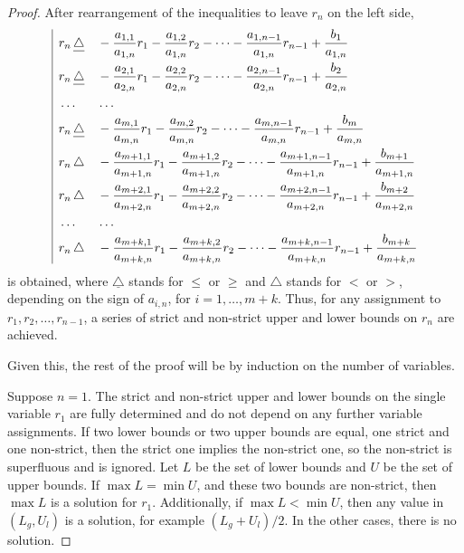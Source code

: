 \documentclass{article}
\begin{document}
\begin{proof}
  After rearrangement of the inequalities to leave $r_n$ on the left side,
  \[
  \begin{array}{|l@{}}
    \begin{aligned}
      &r_n \,\underline\triangle&& - \frac{a_{1, 1}}{a_{1,n}}r_1 - \frac{a_{1, 2}}{a_{1, n}}r_2 - \dots - \frac{a_{1, n - 1}}{a_{1, n}}r_{n - 1} + \frac{b_1}{a_{1, n}} \\
      &r_n \,\underline\triangle&& - \frac{a_{2, 1}}{a_{2,n}}r_1 - \frac{a_{2, 2}}{a_{2, n}}r_2 - \dots - \frac{a_{2, n - 1}}{a_{2, n}}r_{n - 1} + \frac{b_2}{a_{2, n}} \\
      &\dots&&\dots \\
      &r_n \,\underline\triangle&& - \frac{a_{m, 1}}{a_{m,n}}r_1 - \frac{a_{m, 2}}{a_{m, n}}r_2 - \dots - \frac{a_{m, n - 1}}{a_{m, n}}r_{n - 1} + \frac{b_m}{a_{m, n}} \\
      &r_n \,\triangle&& - \frac{a_{m+1, 1}}{a_{m+1,n}}r_1 - \frac{a_{m+1, 2}}{a_{m+1, n}}r_2 - \dots - \frac{a_{m+1, n - 1}}{a_{m+1, n}}r_{n - 1} + \frac{b_{m+1}}{a_{m+1, n}} \\
      &r_n \,\triangle&& - \frac{a_{m+2, 1}}{a_{m+2,n}}r_1 - \frac{a_{m+2, 2}}{a_{m+2, n}}r_2 - \dots - \frac{a_{m+2, n - 1}}{a_{m+2, n}}r_{n - 1} + \frac{b_{m+2}}{a_{m+2, n}} \\
      &\dots&&\dots \\
      &r_n \,\triangle&& - \frac{a_{m+k, 1}}{a_{m+k,n}}r_1 - \frac{a_{m+k, 2}}{a_{m+k, n}}r_2 - \dots - \frac{a_{m+k, n - 1}}{a_{m+k, n}}r_{n - 1} + \frac{b_{m+k}}{a_{m+k, n}} \\
    \end{aligned}
  \end{array}
  \]
  is obtained, where $\underline\triangle$ stands for $\leq$ or $\geq$ and $\triangle$ stands for $<$ or $>$, depending on the sign of $a_{i, n}$, for $i = 1, \dots, m+k$. Thus, for any assignment to $r_1, r_2, \dots, r_{n-1}$, a series of strict and non-strict upper and lower bounds on $r_n$ are achieved.

  Given this, the rest of the proof will be by induction on the number of variables.

  Suppose $n = 1$. The strict and non-strict upper and lower bounds on the single variable $r_1$ are fully determined and do not depend on any further variable assignments. If two lower bounds or two upper bounds are equal, one strict and one non-strict, then the strict one implies the non-strict one, so the non-strict is superfluous and is ignored. Let $L$ be the set of lower bounds and $U$ be the set of upper bounds. If $\max L = \min U$, and these two bounds are non-strict, then $\max L$ is a solution for $r_1$. Additionally, if $\max L < \min U$, then any value in $(L_g, U_l)$ is a solution, for example $(L_g + U_l)/2$. In the other cases, there is no solution.


\end{proof}
\end{document}
